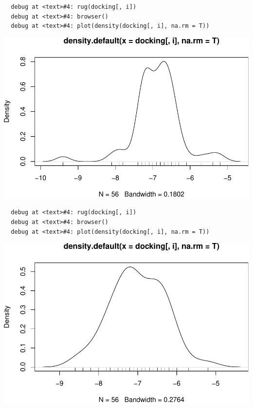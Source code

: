 \documentclass[12pt,twoside]{reedthesis}
\begin{document}
  \begin{verbatim}
  debug at <text>#4: rug(docking[, i])
  debug at <text>#4: browser()
  debug at <text>#4: plot(density(docking[, i], na.rm = T))
  \end{verbatim}
  
  \begin{center}\includegraphics{tesis_files/figure-latex/johan-4} \end{center}
  
  \begin{verbatim}
  debug at <text>#4: rug(docking[, i])
  debug at <text>#4: browser()
  debug at <text>#4: plot(density(docking[, i], na.rm = T))
  \end{verbatim}
  
  \begin{center}\includegraphics{tesis_files/figure-latex/johan-5} \end{center}
  
\end{document}
